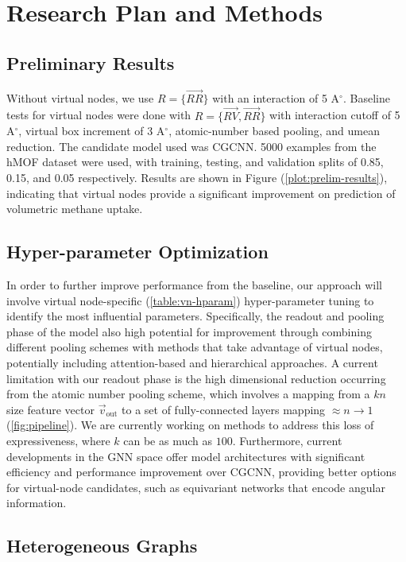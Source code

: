 \documentclass{lxaiproposal}
\begin{document}
\section*{Research Plan and Methods}

\subsection*{Preliminary Results}

Without virtual nodes, we use $R=\{\vec{RR}\}$ with an interaction of 5 A$^\circ$.
Baseline tests for virtual nodes were done with $R=\{\vec{RV},\vec{RR}\}$ with interaction cutoff of 5 A$^\circ$, virtual box increment of 3 A$^\circ$, atomic-number based pooling, and umean reduction. The candidate model used was CGCNN. 5000 examples from the hMOF dataset were used, with training, testing, and validation splits of 0.85, 0.15, and 0.05 respectively. Results are shown in Figure (\ref{plot:prelim-results}), indicating that virtual nodes provide a significant improvement on prediction of volumetric methane uptake.

\subsection*{Hyper-parameter Optimization}

In order to further improve performance from the baseline, our approach will involve virtual node-specific (\ref{table:vn-hparam}) hyper-parameter tuning to identify the most influential parameters.
Specifically, the readout and pooling phase of the model also high potential for improvement through combining different pooling schemes with methods that take advantage of virtual nodes, potentially including attention-based and hierarchical approaches\cite{zhang2019hierarchical}. A current limitation with our readout phase is the high dimensional reduction occurring from the atomic number pooling scheme, which involves a mapping from a $kn$ size feature vector $\vec v_\text{out}$ to a set of fully-connected layers mapping $\approx n\to 1$ (\ref{fig:pipeline}). We are currently working on methods to address this loss of expressiveness, where $k$ can be as much as $100$. Furthermore, current developments in the GNN space offer model architectures with significant efficiency and performance improvement over CGCNN, providing better options for virtual-node candidates, such as equivariant networks that encode angular information\cite{jorgensen2022equivariant}.

\subsection*{Heterogeneous Graphs}
\end{document}
